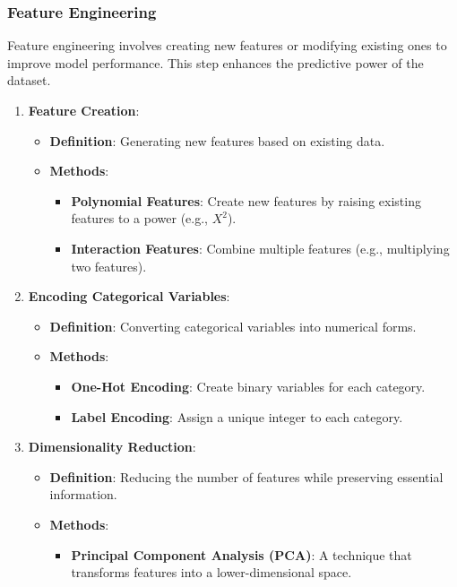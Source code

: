 \documentclass[aspectratio=169]{beamer}
\begin{document}
\begin{frame}[fragile]
    \frametitle{Feature Engineering}
    Feature engineering involves creating new features or modifying existing ones to improve model performance. This step enhances the predictive power of the dataset.

    \begin{enumerate}
        \item \textbf{Feature Creation}:
        \begin{itemize}
            \item \textbf{Definition}: Generating new features based on existing data.
            \item \textbf{Methods}:
            \begin{itemize}
                \item \textbf{Polynomial Features}: Create new features by raising existing features to a power (e.g., \(X^2\)).
                \item \textbf{Interaction Features}: Combine multiple features (e.g., multiplying two features).
            \end{itemize}
        \end{itemize}

        \item \textbf{Encoding Categorical Variables}:
        \begin{itemize}
            \item \textbf{Definition}: Converting categorical variables into numerical forms.
            \item \textbf{Methods}:
            \begin{itemize}
                \item \textbf{One-Hot Encoding}: Create binary variables for each category.
                \item \textbf{Label Encoding}: Assign a unique integer to each category.
            \end{itemize}
        \end{itemize}

        \item \textbf{Dimensionality Reduction}:
        \begin{itemize}
            \item \textbf{Definition}: Reducing the number of features while preserving essential information.
            \item \textbf{Methods}:
            \begin{itemize}
                \item \textbf{Principal Component Analysis (PCA)}: A technique that transforms features into a lower-dimensional space.
            \end{itemize}
        \end{itemize}
    \end{enumerate}
\end{frame}
\end{document}

